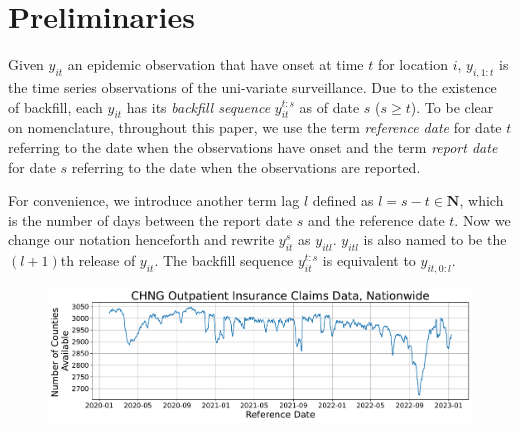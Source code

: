 
\section{Preliminaries}
Given $y_{it}$ an epidemic observation that have onset at time $t$ for location $i$, $y_{i,1:t}$ is the time series observations of the uni-variate surveillance. Due to the existence of backfill, each $y_{it}$ has its \textit{backfill sequence}\cite{kamarthi2021back2future} $y_{it}^{t:s}$ as of date $s$ ($s \geq t$). To be clear on nomenclature, throughout this paper, we use the term \textit{reference date} for date $t$ referring to the date when the observations have onset and the term \textit{report date} for date $s$ referring to the date when the observations are reported. 

For convenience, we introduce another term lag $l$ defined as $l = s-t \in \mathbf{N}$, which is the number of days between the report date $s$ and the reference date $t$. Now we change our notation henceforth and rewrite $y_{it}^s$ as $y_{itl}$. $y_{itl}$ is also named to be the $(l+1)$th release of $y_{it}$. The backfill sequence $y_{it}^{t:s}$ is equivalent to $y_{it,0:l}$. 

\begin{figure}
    \centering
    \includegraphics[width=\textwidth]{figs/available_counties.pdf}
    \caption{\textit{}}
\end{figure}


